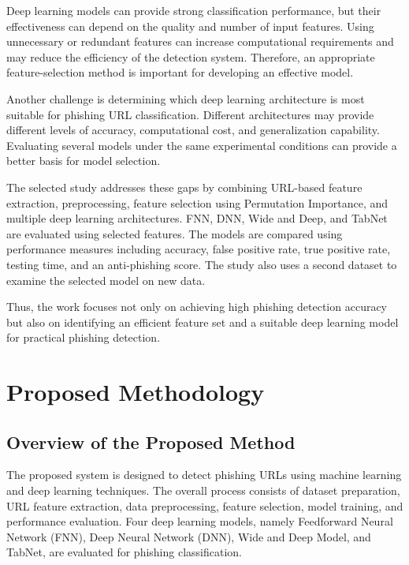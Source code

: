\documentclass[12pt,a4paper]{report}
\begin{document}
Deep learning models can provide strong classification performance, but their effectiveness can depend on the quality and number of input features. Using unnecessary or redundant features can increase computational requirements and may reduce the efficiency of the detection system. Therefore, an appropriate feature-selection method is important for developing an effective model.

Another challenge is determining which deep learning architecture is most suitable for phishing URL classification. Different architectures may provide different levels of accuracy, computational cost, and generalization capability. Evaluating several models under the same experimental conditions can provide a better basis for model selection.

The selected study addresses these gaps by combining URL-based feature extraction, preprocessing, feature selection using Permutation Importance, and multiple deep learning architectures. FNN, DNN, Wide and Deep, and TabNet are evaluated using selected features. The models are compared using performance measures including accuracy, false positive rate, true positive rate, testing time, and an anti-phishing score. The study also uses a second dataset to examine the selected model on new data.

Thus, the work focuses not only on achieving high phishing detection accuracy but also on identifying an efficient feature set and a suitable deep learning model for practical phishing detection.


\chapter{Proposed Methodology}

\section{Overview of the Proposed Method}

The proposed system is designed to detect phishing URLs using machine learning and deep learning techniques. The overall process consists of dataset preparation, URL feature extraction, data preprocessing, feature selection, model training, and performance evaluation. Four deep learning models, namely Feedforward Neural Network (FNN), Deep Neural Network (DNN), Wide and Deep Model, and TabNet, are evaluated for phishing classification.
\end{document}
